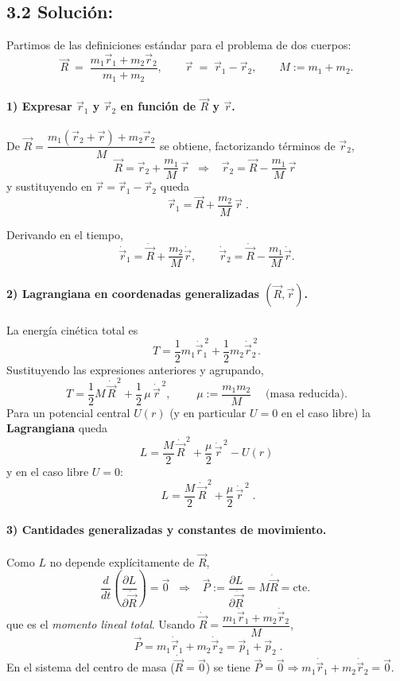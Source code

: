 \subsection*{3.2 \textcolor{Cinnabar}{\textbf{Solución:}}}

Partimos de las definiciones estándar para el problema de dos cuerpos:
\[
\vec{R}\;=\;\frac{m_1\vec{r}_1+m_2\vec{r}_2}{m_1+m_2},
\qquad
\vec{r}\;=\;\vec{r}_1-\vec{r}_2,
\qquad
M:=m_1+m_2.
\]

\paragraph{1) Expresar $\vec{r}_1$ y $\vec{r}_2$ en función de $\vec{R}$ y $\vec{r}$.}
De
\(
\vec{R}=\dfrac{m_1(\vec{r}_2+\vec{r})+m_2\vec{r}_2}{M}
\)
se obtiene, factorizando términos de $\vec{r}_2$,
\[
\vec{R}=\vec{r}_2+\frac{m_1}{M}\,\vec{r}
\;\;\Rightarrow\;\;
\boxed{\;\vec{r}_2=\vec{R}-\frac{m_1}{M}\,\vec{r}\;}
\]
y sustituyendo en
\(
\vec{r}=\vec{r}_1-\vec{r}_2
\)
queda
\[
\boxed{\;\vec{r}_1=\vec{R}+\frac{m_2}{M}\,\vec{r}\;}.
\]

Derivando en el tiempo,
\[
\dot{\vec{r}}_1=\dot{\vec{R}}+\frac{m_2}{M}\dot{\vec{r}},
\qquad
\dot{\vec{r}}_2=\dot{\vec{R}}-\frac{m_1}{M}\dot{\vec{r}}.
\]

\paragraph{2) Lagrangiana en coordenadas generalizadas $(\vec{R},\vec{r})$.}
La energía cinética total es
\[
T=\frac{1}{2}m_1\dot{\vec{r}}_1^{\,2}+\frac{1}{2}m_2\dot{\vec{r}}_2^{\,2}.
\]
Sustituyendo las expresiones anteriores y agrupando,
\[
T=\frac{1}{2}M\,\dot{\vec{R}}^{\,2}+\frac{1}{2}\,\mu\,\dot{\vec{r}}^{\,2},
\qquad
\boxed{\;\mu:=\frac{m_1m_2}{M}\;} \quad \text{(masa reducida)}.
\]
Para un potencial central $U(r)$ (y en particular $U=0$ en el caso libre) la
\textbf{Lagrangiana} queda
\[
\boxed{\;L=\frac{M}{2}\,\dot{\vec{R}}^{\,2}+\frac{\mu}{2}\,\dot{\vec{r}}^{\,2}-U(r)\;}
\]
y en el caso libre \(U=0\):
\[
\boxed{\;L=\frac{M}{2}\,\dot{\vec{R}}^{\,2}+\frac{\mu}{2}\,\dot{\vec{r}}^{\,2}\;}.
\]

\paragraph{3) Cantidades generalizadas y constantes de movimiento.}
Como $L$ no depende explícitamente de $\vec{R}$,
\[
\frac{d}{dt}\!\left(\frac{\partial L}{\partial\dot{\vec{R}}}\right)=\vec{0}
\;\;\Rightarrow\;\;
\boxed{\;\vec{P}:=\frac{\partial L}{\partial\dot{\vec{R}}}=M\dot{\vec{R}}=\text{cte.}\;}
\]
que es el \textit{momento lineal total}. Usando
\(
\dot{\vec{R}}=\dfrac{m_1\dot{\vec{r}}_1+m_2\dot{\vec{r}}_2}{M}
\),
\[
\boxed{\;\vec{P}=m_1\dot{\vec{r}}_1+m_2\dot{\vec{r}}_2=\vec{p}_1+\vec{p}_2\;}.
\]
En el sistema del centro de masa (\(\dot{\vec{R}}=\vec{0}\)) se tiene
\(\vec{P}=\vec{0}\Rightarrow m_1\dot{\vec{r}}_1+m_2\dot{\vec{r}}_2=\vec{0}\).

